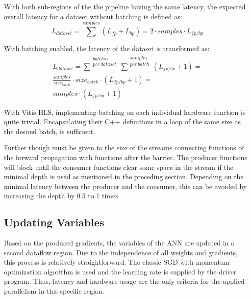 With both sub-regions of the the pipeline having the same latency, the expected overall latency for a dataset without batching is defined as: %
\begin{equation}
L_{dataset} = \sum^{samples}( L_{fp} + L_{bp} ) = 2 \cdot samples \cdot L_{fp/bp}
	\label{eqn: latency dataset no batching}
\end{equation}

With batching enabled, the latency of the dataset is transformed as:
\begin{equation}
    \begin{gathered}
        L_{dataset} = \sum^{\substack{batches\\ per\ dataset}}\sum^{\substack{samples\\ per\ batch}}( L_{fp/bp} + 1 ) =\\
        \frac{samples}{size_{batch}} \cdot size_{batch} \cdot ( L_{fp/bp} + 1 ) =\\
        samples \cdot ( L_{fp/bp} + 1 )
    \end{gathered}
	\label{eqn: latency dataset with batching}
\end{equation}

With Vitis HLS, implementing batching on each individual hardware function is quite trivial. Encapsulating their C++ definitions in a loop of the same size as the desired batch, is sufficient. %

Further though must be given to the size of the streams connecting functions of the forward propagation with functions after the barrier. The producer functions will block until the consumer functions clear some space in the stream if the minimal depth is used as mentioned in the preceding section. Depending on the minimal latency between the producer and the consumer, this can be avoided by increasing the depth by 0.5 to 1 times.

\subsection{Updating Variables}
Based on the produced gradients, the variables of the ANN are updated in a second dataflow region. Due to the independence of all weights and gradients, this process is relatively straightforward. The classic SGD with momentum optimization algorithm is used and the learning rate is supplied by the driver program. Thus, latency and hardware usage are the only criteria for the applied parallelism in this specific region.

